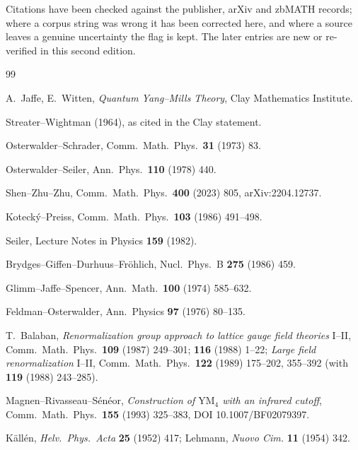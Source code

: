 \clearpage
{}
\label{sec:refs}

Citations have been checked against the publisher, arXiv and zbMATH records; where a corpus
string was wrong it has been corrected here, and where a source leaves a genuine uncertainty
the flag is kept. The later entries are new or re-verified in this second edition.

{\small
\setlength{\itemsep}{1.2pt}
\begin{thebibliography}{99}

 A.~Jaffe, E.~Witten, \emph{Quantum Yang--Mills Theory}, Clay Mathematics
  Institute.

 Streater--Wightman (1964), as cited in the Clay statement.

 Osterwalder--Schrader, Comm.\ Math.\ Phys.\ \textbf{31} (1973) 83.

 Osterwalder--Seiler, Ann.\ Phys.\ \textbf{110} (1978) 440.

 Shen--Zhu--Zhu, Comm.\ Math.\ Phys.\ \textbf{400} (2023) 805, arXiv:2204.12737.

 Koteck\'y--Preiss, Comm.\ Math.\ Phys.\ \textbf{103} (1986) 491--498.

 Seiler, Lecture Notes in Physics \textbf{159} (1982).

 Brydges--Giffen--Durhuus--Fr\"ohlich, Nucl.\ Phys.\ B \textbf{275} (1986) 459.

 Glimm--Jaffe--Spencer, Ann.\ Math.\ \textbf{100} (1974) 585--632.

 Feldman--Osterwalder, Ann.\ Physics \textbf{97} (1976) 80--135.

 T.~Balaban, \emph{Renormalization group approach to lattice gauge field
  theories} I--II, Comm.\ Math.\ Phys.\ \textbf{109} (1987) 249--301; \textbf{116} (1988)
  1--22; \emph{Large field renormalization} I--II, Comm.\ Math.\ Phys.\ \textbf{122} (1989)
  175--202, 355--392 (with \textbf{119} (1988) 243--285).

 Magnen--Rivasseau--S\'en\'eor, \emph{Construction of $\mathrm{YM}_4$ with an
  infrared cutoff}, Comm.\ Math.\ Phys.\ \textbf{155} (1993) 325--383,
  DOI 10.1007/BF02079397.

 K\"all\'en, \emph{Helv.\ Phys.\ Acta} \textbf{25} (1952) 417; Lehmann,
  \emph{Nuovo Cim.} \textbf{11} (1954) 342.


\end{thebibliography}}
